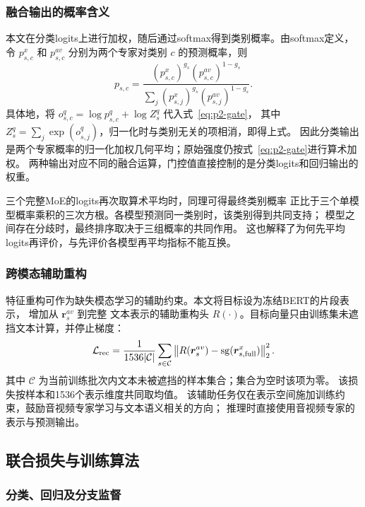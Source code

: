 \documentclass[bwprint]{gmcmthesis}
\begin{document}
\subsubsection{融合输出的概率含义}
本文在分类logits上进行加权，随后通过softmax得到类别概率。由softmax定义\citep{goodfellow2016deep}，
令 $p_{s,c}^x$ 和 $p_{s,c}^{av}$ 分别为两个专家对类别 $c$ 的预测概率，则
\begin{equation}
 p_{s,c}=\frac{(p_{s,c}^x)^{g_s}(p_{s,c}^{av})^{1-g_s}}
 {\sum_j(p_{s,j}^x)^{g_s}(p_{s,j}^{av})^{1-g_s}}.
 \label{eq:p2-geometric-pooling}
\end{equation}
具体地，将 $o_{s,c}^q=\log p_{s,c}^q+\log Z_s^q$ 代入式~\eqref{eq:p2-gate}，
其中 $Z_s^q=\sum_j\exp(o_{s,j}^q)$，归一化时与类别无关的项相消，即得上式。
因此分类输出是两个专家概率的归一化加权几何平均；原始强度仍按式~\eqref{eq:p2-gate}进行算术加权。
两种输出对应不同的融合运算，门控值直接控制的是分类logits和回归输出的权重。

三个完整MoE的logits再次取算术平均时，同理可得最终类别概率
正比于三个单模型概率乘积的三次方根。各模型预测同一类别时，该类别得到共同支持；
模型之间存在分歧时，最终排序取决于三组概率的共同作用。
这也解释了为何先平均logits再评价，与先评价各模型再平均指标不能互换。

\subsubsection{跨模态辅助重构}

特征重构可作为缺失模态学习的辅助约束\citep{mcthfr2024}。本文将目标设为冻结BERT的片段表示，
增加从 $\boldsymbol r_s^{av}$ 到完整
文本表示的辅助重构头 $R(\cdot)$。目标向量只由训练集未遮挡文本计算，并停止梯度：
\begin{equation}
 \mathcal L_{\rm rec}=\frac{1}{1536|\mathcal C|}\sum_{s\in\mathcal C}
 \left\|R(\boldsymbol r_s^{av})-\operatorname{sg}(\boldsymbol r_{s,\rm full}^x)\right\|_2^2.
 \label{eq:p2-reconstruction}
\end{equation}
其中 $\mathcal C$ 为当前训练批次内文本未被遮挡的样本集合；集合为空时该项为零。
该损失按样本和1536个表示维度共同取均值。
该辅助任务仅在表示空间施加训练约束，鼓励音视频专家学习与文本语义相关的方向；
推理时直接使用音视频专家的表示与预测输出。

\subsection{联合损失与训练算法}

\subsubsection{分类、回归及分支监督}
\end{document}

